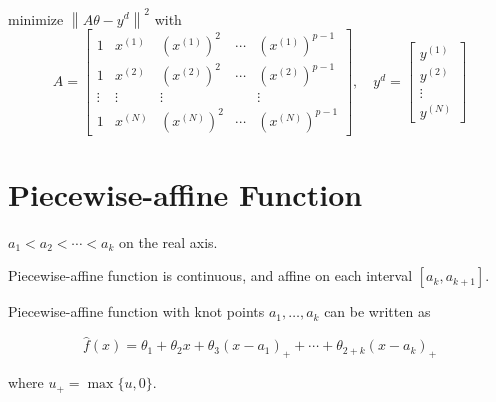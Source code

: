 \begin{problem} 
    minimize $ \left\|A \theta-y^{{d}}\right\|^{2} $ with
    \begin{equation}
    A=\left[\begin{array}{ccccc}
    1 & x^{(1)} & \left(x^{(1)}\right)^{2} & \cdots & \left(x^{(1)}\right)^{p-1} \\
    1 & x^{(2)} & \left(x^{(2)}\right)^{2} & \cdots & \left(x^{(2)}\right)^{p-1} \\
    \vdots & \vdots & \vdots & & \vdots \\
    1 & x^{(N)} & \left(x^{(N)}\right)^{2} & \cdots & \left(x^{(N)}\right)^{p-1}
    \end{array}\right], \quad y^{{d}}=\left[\begin{array}{c}
    y^{(1)} \\
    y^{(2)} \\
    \vdots \\
    y^{(N)}
    \end{array}\right]
    \end{equation}
\end{problem}


\section{Piecewise-affine Function}

\begin{definition}
    $ a_{1}<a_{2}<\cdots<a_{k} $ on the real axis.
\end{definition}

\begin{proposition}
    Piecewise-affine function is continuous, and affine on each interval $ \left[a_{k}, a_{k+1}\right] $.
\end{proposition}

\begin{theorem}
    Piecewise-affine function with knot points $ a_{1}, \ldots, a_{k} $ can be written as

    \begin{equation}
    \hat{f}(x)=\theta_{1}+\theta_{2} x+\theta_{3}\left(x-a_{1}\right)_{+}+\cdots+\theta_{2+k}\left(x-a_{k}\right)_{+}
    \end{equation}

    where $ u_{+}=\max \{u, 0\} $.
\end{theorem}



